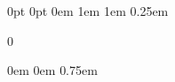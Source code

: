 

\DefineNewLength{\UWMad@Widest}         {0pt}        %
\DefineNewLength{\UWMad@WidestTest}     {0pt}        %
\DefineNewLength{\NomenTitleSkip}       {0em}        %
\DefineNewLength{\NomenPrintSkip}       {1em}        %
\DefineNewLength{\EntryMarginLeft}      {1em}
\DefineNewLength{\EntryMarginBottom}    {0.25em}

   {0}

\let\MakeNomenclatureStarred\UWMad@MakeNomenclatureStarredtrue
\let\MakeNomenclatureNotStarred\UWMad@MakeNomenclatureStarredfalse

\newcommand*{\UWMad@UpdateWidest}[1]{%
    \settowidth{\UWMad@WidestTest}{#1}%
    \ifdim\UWMad@Widest<\UWMad@WidestTest%
        \setlength{\UWMad@Widest}{\UWMad@WidestTest}%
    \fi%
}
%
%
\newcommand*{\TheNomenclatureName}{Nomenclature}
\newcommand{\NomenclatureName}[1]{%
    \renewcommand*{\TheNomenclatureName}{#1}%
}
%
\newcommand*{\TheNomenGroupName}{}
\newcommand{\NomenGroupName}[1]{%
    \renewcommand*{\TheNomenGroupName}{#1}%
}
%
%
\newcommand{\NomenclatureNameStyle}{
    \IfEmpty{\TheNomenGroupName}%
        {}%
        {\ifUWMad@MakeNomenclatureStarred%
            \csname\TheCurrentSectioningCommand\endcsname*%
                {\TheNomenGroupName}%
            \UWMad@FrontMatterRegister%
                [\TheCurrentSectioningCommand]%
                {\TheNomenGroupName}
         \else%
            \csname\TheCurrentSectioningCommand\endcsname{\TheNomenGroupName}%
         \fi}%
}
%
%
\newcommand*{\TheCurrentSectioningCommand}{}
\newcommand{\CurrentSectioningCommand}[1]{%
    \renewcommand*{\TheCurrentSectioningCommand}{#1}%
}


\DefineNewLength{\SymbolWidth}          {0em}
\DefineNewLength{\DescriptionWidth}     {0em}
\DefineNewLength{\SymbolDescriptionPad} {0.75em}


